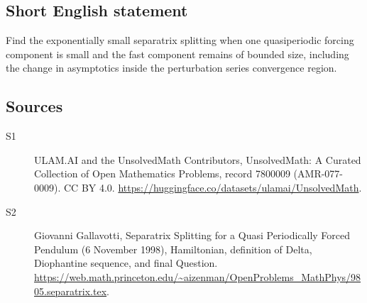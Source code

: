 \documentclass[11pt]{article}
\begin{document}
\subsection{Short English statement}
Find the exponentially small separatrix splitting when one quasiperiodic forcing component is small and the fast component remains of bounded size, including the change in asymptotics inside the perturbation series convergence region.
\subsection{Sources}
\begin{description}
\item[\hypertarget{source:7800009:1}{S1}] ULAM.AI and the UnsolvedMath Contributors, UnsolvedMath: A Curated Collection of Open Mathematics Problems, record 7800009 (AMR-077-0009). CC BY 4.0. \url{https://huggingface.co/datasets/ulamai/UnsolvedMath}.
\item[\hypertarget{source:7800009:2}{S2}] Giovanni Gallavotti, Separatrix Splitting for a Quasi Periodically Forced Pendulum (6 November 1998), Hamiltonian, definition of Delta, Diophantine sequence, and final Question. \url{https://web.math.princeton.edu/~aizenman/OpenProblems_MathPhys/9805.separatrix.tex}.
\end{description}
\label{end:7800009}
\end{document}
